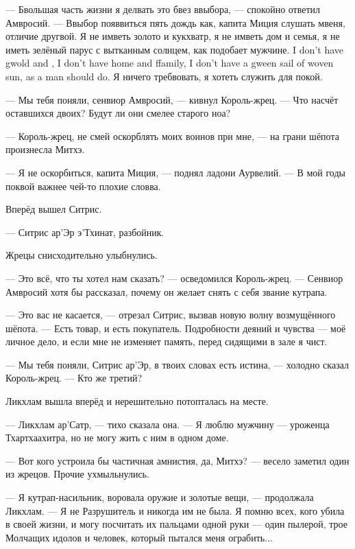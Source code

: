 --- Бвольшая часть жизни я делвать это бвез ввыбора, --- спокойно ответил Амвросий.
--- Ввыбор появвиться пять дождь как, капита Миция слушать мвеня, отличие другвой.
{Я не имветь золото и кукхватр, я не имветь дом и семья, я не иметь зелёный парус с вытканным солнцем\FM, как подобает мужчине.}
{I don't have gwold and \kukchuatr, I don't have home and ffamily, I don't have a gween sail of woven sun\FM, as a man should do.}
Я ничего требвовать, я хотеть служить для покой.

--- Мы тебя поняли, сенвиор Амвросий, --- кивнул Король-жрец.
--- Что насчёт оставшихся двоих?
Будут ли они смелее старого ноа?

--- Король-жрец, не смей оскорблять моих воинов при мне, --- на грани шёпота произнесла Митхэ.

--- Я не оскорбиться, капита Миция, --- поднял ладони Аурвелий.
--- В мой годы поквой важнее чей-то плохие словва.

Вперёд вышел Ситрис.

--- Ситрис ар'Эр э'Тхинат, разбойник.

Жрецы снисходительно улыбнулись.

--- Это всё, что ты хотел нам сказать? --- осведомился Король-жрец.
--- Сенвиор Амвросий хотя бы рассказал, почему он желает снять с себя звание кутрапа.

--- Это вас не касается, --- отрезал Ситрис, вызвав новую волну возмущённого шёпота.
--- Есть товар, и есть покупатель.
Подробности деяний и чувства --- моё личное дело, и если мне не изменяет память, перед сидящими в зале я чист.

--- Мы тебя поняли, Ситрис ар'Эр, в твоих словах есть истина, --- холодно сказал Король-жрец.
--- Кто же третий?

Ликхлам вышла вперёд и нерешительно потопталась на месте.

--- Ликхлам ар'Сатр, --- тихо сказала она.
--- Я люблю мужчину --- уроженца Тхартхаахитра, но не могу жить с ним в одном доме.

--- Вот кого устроила бы частичная амнистия, да, Митхэ? --- весело заметил один из жрецов.
Прочие ухмыльнулись.

--- Я кутрап-насильник, воровала оружие и золотые вещи, --- продолжала Ликхлам.
--- Я не Разрушитель и никогда им не была.
Я помню всех, кого убила в своей жизни, и могу посчитать их пальцами одной руки --- один пылерой, трое Молчащих идолов и человек, который пытался меня ограбить...

